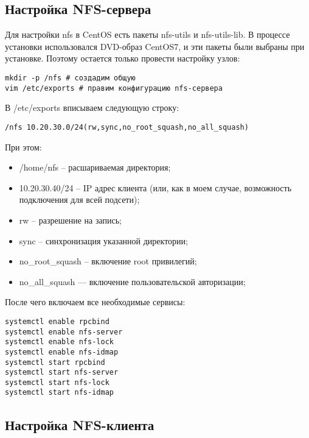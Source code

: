 \subsection{Настройка NFS-сервера}

Для настройки nfs в CentOS есть пакеты \textmd{nfs-utils} и
\textmd{nfs-utils-lib}. В процессе установки
использовался DVD-образ CentOS7, и эти пакеты были выбраны
при установке. Поэтому остается только провести настройку
узлов:
\begin{verbatim}
mkdir -p /nfs # создадим общую
vim /etc/exports # правим конфигурацию nfs-сервера
\end{verbatim}
В /etc/exports вписываем следующую строку:
\begin{verbatim}
/nfs 10.20.30.0/24(rw,sync,no_root_squash,no_all_squash)
\end{verbatim}
При этом:
\begin{itemize}
  \item /home/nfs – расшариваемая директория;
  \item 10.20.30.40/24 – IP адрес клиента (или, как в моем случае, возможность подключения для всей подсети);
  \item rw – разрешение на запись;
  \item sync – синхронизация указанной директории;
  \item no\_root\_squash – включение root привилегий;
  \item no\_all\_squash — включение пользовательской авторизации;
\end{itemize}
После чего включаем все необходимые сервисы:
\begin{verbatim}
systemctl enable rpcbind
systemctl enable nfs-server
systemctl enable nfs-lock
systemctl enable nfs-idmap
systemctl start rpcbind
systemctl start nfs-server
systemctl start nfs-lock
systemctl start nfs-idmap
\end{verbatim}

\subsection{Настройка NFS-клиента}

